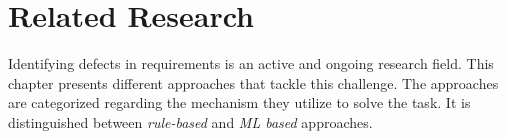 \chapter{Related Research}
\label{chp:related_research}
Identifying defects in requirements is an active and ongoing research field.
This chapter presents different approaches that tackle this challenge.
The approaches are categorized regarding the mechanism they utilize to solve the task.
It is distinguished between \textit{rule-based} and \textit{\ac{ML} based} approaches.




